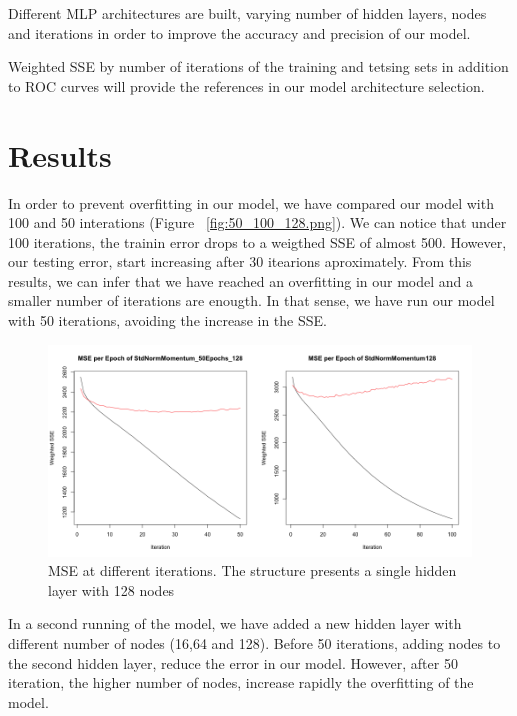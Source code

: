 \documentclass[11.5pt]{article}
\newcounter{Figure}
\newcounter{graphics}
\begin{document}
Different  MLP architectures are built, varying number of hidden layers, nodes and iterations in order to improve the accuracy and precision of our model.

Weighted SSE by number of iterations of the training and tetsing sets in addition to ROC curves will provide the references in our model architecture selection.

\section{Results}

In order to prevent overfitting in our model, we have compared our model with 100 and 50 interations (Figure ~\ref{fig:50_100_128.png}). We can notice that under 100 iterations, the trainin error drops to a weigthed SSE of almost 500. However, our testing error, start increasing after 30 itearions aproximately. From this results, we can infer that we have reached an overfitting in our model and a smaller number of iterations are enougth. In that sense, we have run our model with 50 iterations, avoiding the increase in the SSE.\par
 

\begin{figure}[h!]
  \caption{MSE at different iterations. The structure presents a single hidden layer with 128 nodes}
  \includegraphics[width=1\textwidth]{report_mlp/50_100_128.png}

\end{figure}


In a second running of the model, we have added a new hidden layer  with different number of nodes (16,64 and 128). Before 50 iterations, adding nodes to the second hidden layer, reduce the error in our model. However, after 50 iteration, the higher number of nodes, increase rapidly the overfitting  of the model. \par 
\end{document}
